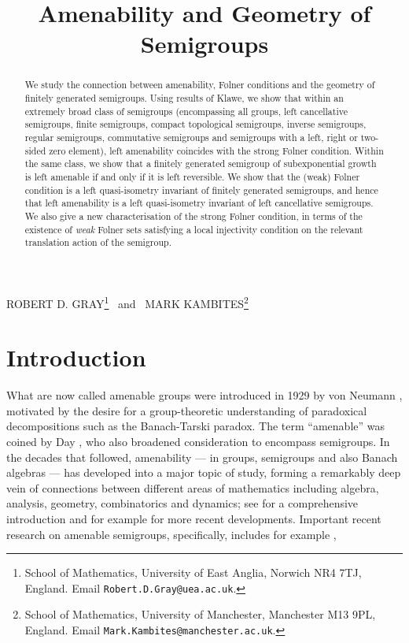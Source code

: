 \documentclass[11pt,a4paper,reqno]{amsart}
\begin{document}
\title[Amenability and Geometry of Semigroups]{Amenability and Geometry of Semigroups}

\maketitle

\begin{center}
    ROBERT D. GRAY\footnote{School of Mathematics, University of East Anglia, Norwich NR4 7TJ, England.
Email \texttt{Robert.D.Gray@uea.ac.uk}.}
\ and \ MARK KAMBITES\footnote{School of Mathematics, University of Manchester, Manchester M13 9PL, England. Email \texttt{Mark.Kambites@manchester.ac.uk}.} \\
\end{center}

\begin{abstract}
We study the connection between amenability, F\o lner conditions and the geometry of finitely generated semigroups. Using
results of Klawe, we show that within an extremely broad class of semigroups (encompassing all groups, left
cancellative semigroups, finite semigroups, compact topological semigroups, inverse semigroups, regular semigroups, commutative semigroups and semigroups with a left, right or two-sided zero element), left amenability coincides with the strong F\o lner condition. Within the same class, we show that a finitely generated semigroup of subexponential growth is left amenable if and only if it is left reversible.
We show that the (weak) F\o lner condition is a left quasi-isometry invariant of finitely generated semigroups, and hence that left amenability is a left quasi-isometry invariant of left cancellative semigroups. We also give a new characterisation of the strong F\o lner condition, in terms of the existence of \textit{weak} F\o lner sets satisfying a local injectivity condition on the relevant translation action of the semigroup. 
\end{abstract}

\section{Introduction}\label{sec_intro}

What are now called amenable groups were introduced in 1929 by von Neumann
\cite{vonNeumann29}, motivated by the desire for a group-theoretic
understanding of paradoxical decompositions such as the Banach-Tarski
paradox. The term ``amenable'' was coined by Day \cite{Day57}, who also
broadened consideration to encompass semigroups. In the decades that
followed, amenability --- in groups,
semigroups and also Banach algebras --- has developed into a major topic
of study, forming a remarkably deep vein of connections
between different areas of mathematics including algebra, analysis, geometry,
combinatorics and dynamics; see \cite{Paterson88} for a comprehensive
introduction and for example \cite{Cecc10} for more recent developments.
Important recent research on amenable semigroups, specifically, includes
for example \cite{Cecc15,Donnelly13,Willson09},
\end{document}
